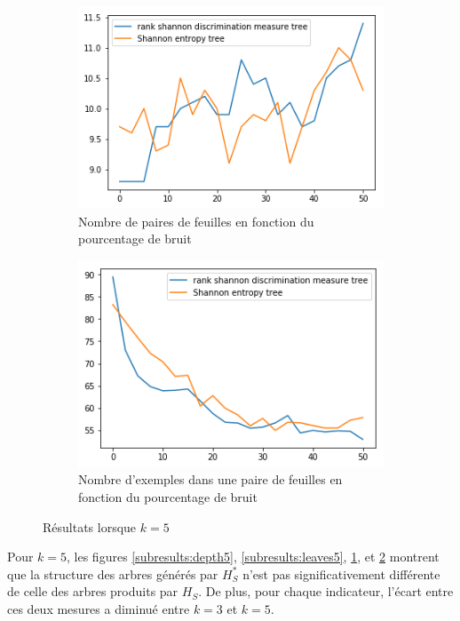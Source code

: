 \documentclass[a4paper]{article}
\begin{document}
\begin{figure}[H]
    \begin{subfigure}[c]{0.46\textwidth}
        \centering
        \includegraphics[width=\textwidth]{images/nbpairs_5.png}
        \caption{Nombre de paires de feuilles en fonction du pourcentage de bruit}
    \label{subresults:pairs5}
    \end{subfigure}
    \begin{subfigure}[c]{0.46\textwidth}
        \centering
        \includegraphics[width=\textwidth]{images/nbexamples_5.png}
        \caption{Nombre d'exemples dans une paire de feuilles en fonction du pourcentage de bruit}
    \label{subresults:ex5}
    \end{subfigure}

    \caption{Résultats lorsque $k=5$}
    \label{results:artificial5}
\end{figure}

Pour $k=5$, les figures \ref{subresults:depth5}, \ref{subresults:leaves5},
\ref{subresults:pairs5}, et \ref{subresults:ex5} montrent que la structure des
arbres générés par $H^*_S$ n'est pas significativement différente de celle des
arbres produits par $H_S$. De plus, pour chaque indicateur, l'écart entre ces
deux mesures a diminué entre $k=3$ et $k=5$.
\end{document}
